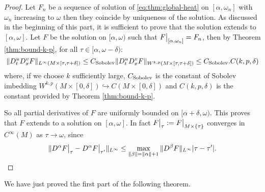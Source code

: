 \begin{proof}
Let \(F_n\) be a sequence of solution of \eqref{eq:thm:global-heat} on \([\alpha,\omega_n]\) with \(\omega_n\) increasing to \(\omega\) then they coincide by
uniqueness of the solution. As discussed in the beginning of this part, it is
sufficient to prove that the solution extends to \([\alpha,\omega]\). Let \(F\) be the
solution on \([\alpha,\omega)\) such that \(\restr{F}{[\alpha,\omega_n]} = F_n\), then
by Theorem \ref{thm:bound-k-p}, for all \(\tau \in [\alpha,\omega-\delta)\):
\[
 \| D^u_t D^v_x F \|_{L^\infty(M\times[\tau,\tau+\delta])} \leq C_{\rm Sobolev} \| D^u_t D^v_x F
\|_{W^{k,p}(M\times[\tau,\tau+\delta])} \leq C_{\rm Sobolev} . C(k,p,\delta)
\]
where, if we choose \(k\) sufficiently large, \(C_{\rm Sobolev}\) is the constant of Sobolev imbedding \(W^{k,p}(M\times[0,\delta]) \hookrightarrow C(M\times[0,\delta])\) and \(C(k,p,\delta)\)
is the constant provided by Theorem \ref{thm:bound-k-p}. 

So all partial derivatives of \(F\) are uniformly bounded on \([\alpha +\delta,\omega)\). This proves that \(F\) extends
to a solution on \([\alpha,\omega]\). In fact \(\restr{F}{\tau}:=\restr{F}{M\times\{\tau\}}\) converges
in \(C^\infty(M)\) as \(\tau\to \omega\), since 
\[ \|D^\alpha \restr{F}{\tau} -
D^\alpha\restr{F}{\tau'}\|_{L^\infty} \leq \max_{\|\beta\| =
\|\alpha\|+1}\|D^{\beta}F\|_{L^\infty}|\tau-\tau'|. 
\]
\end{proof}

We have just proved the first part of the following theorem.

